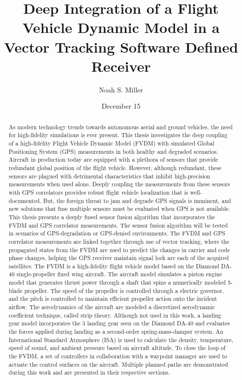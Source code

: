 \documentclass[12pt]{report}
\title{Deep Integration of a Flight Vehicle Dynamic Model in a Vector Tracking Software Defined Receiver}
\author{Noah S. Miller}
\date{December 15}
\begin{document}
\begin{romanpages}      %

  \TitlePage{}
  \begin{abstract}
    As modern technology trends towards autonomous aerial and ground vehicles, the need for high-fidelity simulations is ever present. This thesis investigates the deep coupling of a high-fidelity Flight Vehicle Dynamic Model (FVDM) with simulated Global Positioning System (GPS) measurements in both healthy and degraded scenarios.
    Aircraft in production today are equipped with a plethora of sensors that provide redundant global position of the flight vehicle. However, although redundant, these sensors are plagued with detrimental characteristics that inhibit high-precision measurements when used alone. Deeply coupling the measurements from these sensors with GPS correlators provides robust flight vehicle localization that is well-documented. But, the foreign threat to jam and degrade GPS signals is imminent, and new solutions that fuse multiple sensors must be evaluated when GPS is not available.
    This thesis presents a deeply fused sensor fusion algorithm that incorporates the FVDM and GPS correlator measurements. The sensor fusion algorithm will be tested in scenarios of GPS-degradation or GPS-denied environments. The FVDM and GPS correlator measurements are linked together through use of vector tracking, where the propagated states from the FVDM are used to predict the changes in carrier and code phase changes, helping the GPS receiver maintain signal lock are each of the acquired satellites.
    The FVDM is a high-fidelity flight vehicle model based on the Diamond DA-40 single-propeller fixed wing aircraft. The aircraft model simulates a piston engine model that generates thrust power through a shaft that spins a numerically modeled 5-blade propeller. The speed of the propeller is controlled through a electric governor, and the pitch is controlled to maintain efficient propeller action onto the incident airflow. The aerodynamics of the aircraft are modeled a discretized aerodynamic coefficient technique, called strip theory. Although not used in this work, a landing gear model incorporates the 3 landing gear seen on the Diamond DA-40 and evaluates the forces applied during landing as a second-order spring-mass-damper system. An International Standard Atmosphere (ISA) is used to calculate the density, temperature, speed of sound, and ambient pressure based on aircraft altitude. To close the loop of the FVDM, a set of controllers in collaboration with a waypoint manager are used to actuate the control surfaces on the aircraft. Multiple planned paths are demonstrated during this work and are presented in their respective sections.

\end{abstract}
\end{romanpages}
\end{document}
